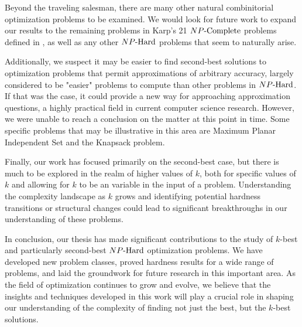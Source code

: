 Beyond the traveling salesman, there are many other natural combinitorial optimization problems to be examined. We would look for future work to expand our results to the remaining problems in Karp's 21 ${NP\text{-Complete}}{}$ problems defined in \cite{karp1972reducibility}, as well as any other ${NP\text{-Hard{}}}$ problems that seem to naturally arise.

Additionally, we suspect it may be easier to find second-best solutions to optimization problems that permit approximations of arbitrary accuracy, largely considered to be "easier" problems to compute than other problems in ${NP\text{-Hard{}}}$. If that was the case, it could provide a new way for approaching approximation questions, a highly practical field in current computer science research. However, we were unable to reach a conclusion on the matter at this point in time. Some specific problems that may be illustrative in this area are Maximum Planar Independent Set and the Knapsack problem.

Finally, our work has focused primarily on the second-best case, but there is much to be explored in the realm of higher values of $k$, both for specific values of $k$ and allowing for $k$ to be an variable in the input of a problem. Understanding the complexity landscape as $k$ grows and identifying potential hardness transitions or structural changes could lead to significant breakthroughs in our understanding of these problems.

In conclusion, our thesis has made significant contributions to the study of $k$-best and particularly second-best ${NP\text{-Hard{}}}$ optimization problems. We have developed new problem classes, proved hardness results for a wide range of problems, and laid the groundwork for future research in this important area. As the field of optimization continues to grow and evolve, we believe that the insights and techniques developed in this work will play a crucial role in shaping our understanding of the complexity of finding not just the best, but the $k$-best solutions.

